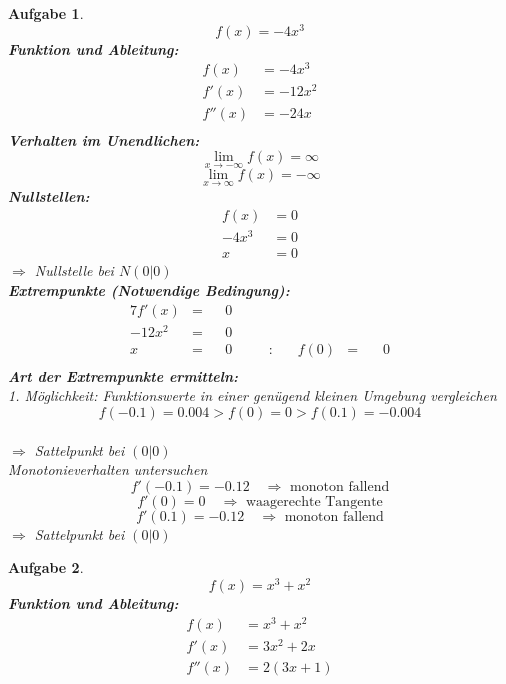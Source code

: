 \documentclass[12pt]{article}
\theoremstyle{note}
\newtheorem{aufgabe}{Aufgabe}
\begin{document}
\begin{flushleft}
\begin{aufgabe} ~  
$$f(x)=- 4 x^{3}$$ 
{\bf Funktion und Ableitung:} 
\begin{align*} 
f(x)&=- 4 x^{3}\\ 
f'(x)&=- 12 x^{2}\\ 
f''(x)&=- 24 x\\ 
\end{align*} 
{\bf Verhalten im Unendlichen:} 
\[ \lim_{x\rightarrow -\infty} f(x) =\infty\]\[ \lim_{x\rightarrow\infty} f(x) =-\infty\]{\bf Nullstellen:} 
\begin{align*} 
f(x)&=0 \\ 
- 4 x^{3}&=0 \\ 
x&=0\end{align*} 
$\Rightarrow$ Nullstelle bei $N(0|0)$ \\ 
{\bf Extrempunkte (Notwendige Bedingung):} 
\begin{alignat*}{7} 
f'(x)&=& &0& \\ 
- 12 x^{2}&=& &0& \\ 
x&=& &0& \quad &:& \quad f(0)&=& \, &0\\ 
\end{alignat*} 
{\bf Art der Extrempunkte ermitteln:} \\[1em] 
{\em 1. M\"oglichkeit:} Funktionswerte in einer gen\"ugend kleinen Umgebung vergleichen \\ 
$$f(-0.1)=0.004  >  f(0)=0  >  f(0.1)=-0.004$$\\ 
$\Rightarrow$ Sattelpunkt bei $(0|0)$ \\ 
\vspace{1em}{\em 2. M\"oglichkeit:} Monotonieverhalten untersuchen \\ 
$$f'(-0.1)=-0.12\quad \Rightarrow \text{ monoton fallend} $$$$f'(0)=0 \quad \Rightarrow \text{ waagerechte Tangente} $$$$f'(0.1)=-0.12\quad \Rightarrow \text{ monoton fallend} $$$\Rightarrow$ Sattelpunkt bei $(0|0)$ \\ 
\vspace{1em}
\end{aufgabe}\clearpage\begin{aufgabe} ~  
$$f(x)=x^{3} + x^{2}$$ 
{\bf Funktion und Ableitung:} 
\begin{align*} 
f(x)&=x^{3} + x^{2}\\ 
f'(x)&=3 x^{2} + 2 x\\ 
f''(x)&=2 \left(3 x + 1\right)\\ 
\end{align*} 

\end{aufgabe}
\end{flushleft}
\end{document}

